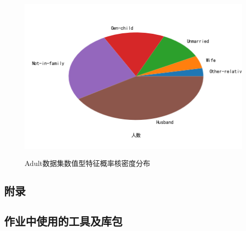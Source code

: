 \documentclass[12pt,a4paper]{article}
\theoremstyle{definition}
\begin{document}
\begin{figure}[H]
{		\includegraphics[width=0.45\linewidth]{img/relationship_dis.png}
	}
	\caption{Adult数据集数值型特征概率核密度分布}
	\label{fig:class_feature_dis}
\end{figure}

\newpage
\begin{appendix}
	\section{附录}
	\subsection{作业中使用的工具及库包}
	\label{apd:tools}
	

	
\end{appendix}




\end{document}
